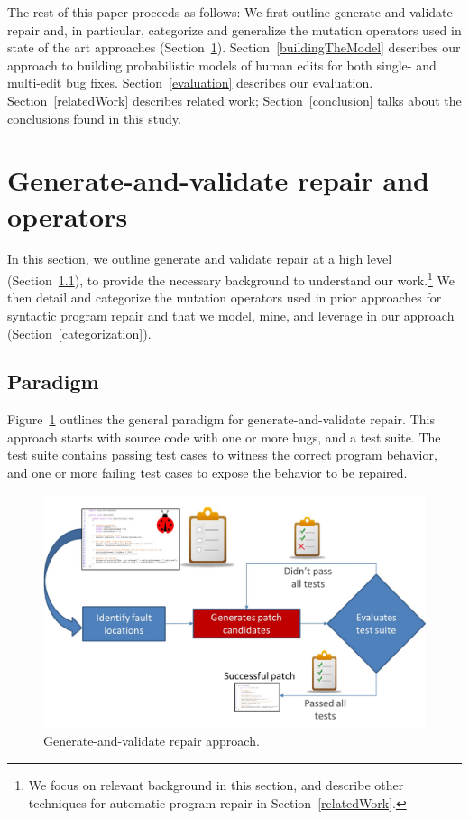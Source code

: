 \documentclass[conference]{IEEEtran}
\begin{document}
The rest of this paper proceeds as follows: We first outline
generate-and-validate repair and, in particular, 
categorize and generalize the mutation operators used in state of the art
approaches (Section~\ref{background}). Section~\ref{buildingTheModel}
describes our approach to building probabilistic models of human 
edits for both single- and multi-edit bug fixes. Section~\ref{evaluation}
describes our evaluation. Section~\ref{relatedWork} describes
related work; Section~\ref{conclusion} talks about the conclusions found in this study. 

\section{Generate-and-validate repair and operators} 
\label{background}

In this section, we outline generate and validate repair at a high level
(Section~\ref{sec-paradigm}), to provide the necessary background to understand our
work.\footnote{We focus on relevant background in this section, and describe
  other techniques for automatic program repair in Section~\ref{relatedWork}.}
  We then detail and categorize the mutation operators used in prior approaches
  for syntactic program repair and that we model, mine, and leverage in our approach
(Section~\ref{categorization}).  
 
 
\subsection{Paradigm}
\label{sec-paradigm}


Figure~\ref{fig:generateandvalidate} outlines the general paradigm for generate-and-validate repair. This approach starts with source code with one or more bugs, and a test suite. The test suite contains passing
test cases to witness the correct program behavior, and one or more failing test 
cases to expose the behavior to be repaired.

\begin{figure}[!h]
  \centering
    \includegraphics[width=\columnwidth]{Picture1}
  \caption{Generate-and-validate repair approach.}
  \label{fig:generateandvalidate}
\end{figure}
\end{document}
